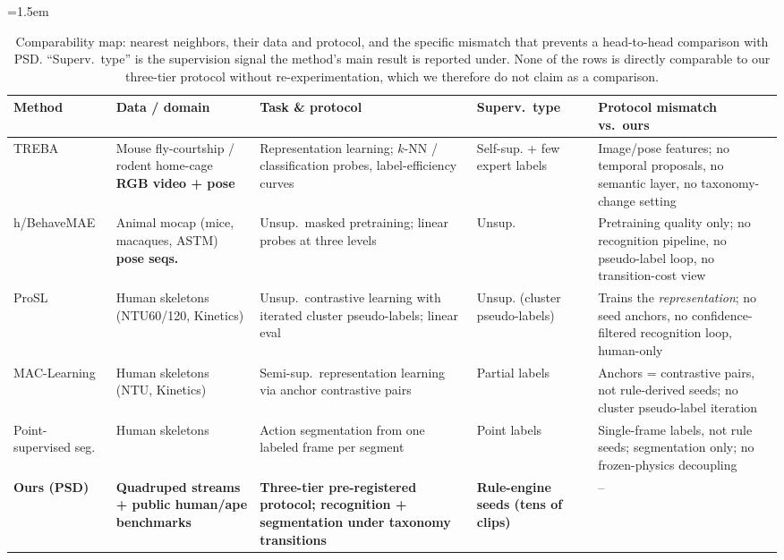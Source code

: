 \documentclass[11pt,a4paper]{article}
\begin{document}
\begin{table}[t]
\centering
\caption{Comparability map: nearest neighbors, their data and protocol, and the specific mismatch that prevents a head-to-head comparison with PSD. ``Superv.\ type'' is the supervision signal the method's main result is reported under. None of the rows is directly comparable to our three-tier protocol without re-experimentation, which we therefore do not claim as a comparison.}
\label{tab:compmap}
\small
\setlength{\tabcolsep}{4pt}
\emergencystretch=1.5em
\begin{tabularx}{\linewidth}{>{\raggedright\arraybackslash}p{2.65cm}>{\raggedright\arraybackslash}p{2.3cm}>{\raggedright\arraybackslash}p{2.3cm}>{\raggedright\arraybackslash}p{1.9cm}X}
\hline
Method & Data / domain & Task \& protocol & Superv.\ type & Protocol mismatch vs.\ ours \\
\hline
TREBA~\citep{sun2021treba} & Mouse fly-courtship / rodent home-cage \textbf{RGB video + pose} & Representation learning; $k$-NN / classification probes, label-efficiency curves & Self-sup. + few expert labels & Image/pose features; no temporal proposals, no semantic layer, no taxonomy-change setting \\
h/BehaveMAE \citep{stoffl2024behavemae} & Animal mocap (mice, macaques, ASTM) \textbf{pose seqs.} & Unsup.\ masked pretraining; linear probes at three levels & Unsup. & Pretraining quality only; no recognition pipeline, no pseudo-label loop, no transition-cost view \\
ProSL~\citep{qin2025prosl} & Human skeletons (NTU60/120, Kinetics) & Unsup.\ contrastive learning with iterated cluster pseudo-labels; linear eval & Unsup. (cluster pseudo-labels) & Trains the \emph{representation}; no seed anchors, no confidence-filtered recognition loop, human-only \\
MAC-Learning~\citep{mac2022learning} & Human skeletons (NTU, Kinetics) & Semi-sup.\ representation learning via anchor contrastive pairs & Partial labels & Anchors = contrastive pairs, not rule-derived seeds; no cluster pseudo-label iteration \\
Point-supervised seg.~\citep{pointsup2026} & Human skeletons & Action segmentation from one labeled frame per segment & Point labels & Single-frame labels, not rule seeds; segmentation only; no frozen-physics decoupling \\
\textbf{Ours (PSD)} & \textbf{Qua\-druped streams + public human/ape bench\-marks} & \textbf{Three-tier pre-registered protocol; recog\-nition + segmen\-tation under taxonomy transi\-tions} & \textbf{Rule-en\-gine seeds (tens of clips)} & -- \\
\hline
\end{tabularx}
\end{table}
\end{document}
